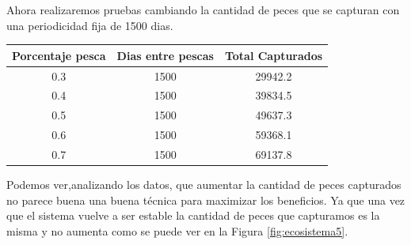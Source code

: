 \documentclass[12pt,a4paper]{article}
\begin{document}
Ahora realizaremos pruebas cambiando la cantidad de peces que se capturan con una periodicidad fija de 1500 dias.\\
\begin{tabular}{|c|c|c|}
	\hline 
	\textbf{Porcentaje pesca} & \textbf{Dias entre pescas} & \textbf{Total Capturados} \\ 
	\hline 
	0.3& 1500& 29942.2 \\
	0.4& 1500 & 39834.5 \\ 
	0.5& 1500 & 49637.3 \\
	0.6& 1500 & 59368.1 \\
	0.7& 1500 & 69137.8 \\
	\hline
\end{tabular}
Podemos ver,analizando los datos, que aumentar la cantidad de peces capturados no parece buena una buena técnica para maximizar los beneficios. Ya que una vez que el sistema vuelve a ser estable la cantidad de peces que capturamos es la misma y no aumenta como se puede ver en la Figura \ref{fig:ecosistema5}. 
\end{document}

